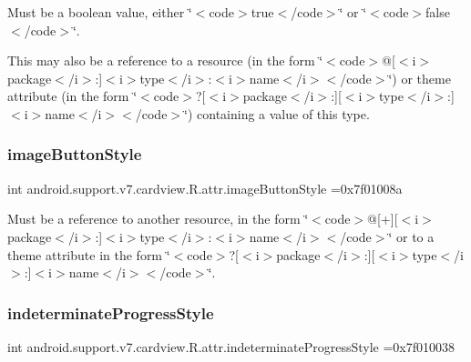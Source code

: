 Must be a boolean value, either \char`\"{}$<$code$>$true$<$/code$>$\char`\"{} or \char`\"{}$<$code$>$false$<$/code$>$\char`\"{}. 

This may also be a reference to a resource (in the form \char`\"{}$<$code$>$@\mbox{[}$<$i$>$package$<$/i$>$\+:\mbox{]}$<$i$>$type$<$/i$>$\+:$<$i$>$name$<$/i$>$$<$/code$>$\char`\"{}) or theme attribute (in the form \char`\"{}$<$code$>$?\mbox{[}$<$i$>$package$<$/i$>$\+:\mbox{]}\mbox{[}$<$i$>$type$<$/i$>$\+:\mbox{]}$<$i$>$name$<$/i$>$$<$/code$>$\char`\"{}) containing a value of this type. \mbox{\label{classandroid_1_1support_1_1v7_1_1cardview_1_1R_1_1attr_a36e9cbb5329e25be31dcb0c96046568d}} 
\subsubsection{\texorpdfstring{image\+Button\+Style}{imageButtonStyle}}
{\footnotesize\ttfamily int android.\+support.\+v7.\+cardview.\+R.\+attr.\+image\+Button\+Style =0x7f01008a\hspace{0.3cm}{\ttfamily [static]}}

Must be a reference to another resource, in the form \char`\"{}$<$code$>$@\mbox{[}+\mbox{]}\mbox{[}$<$i$>$package$<$/i$>$\+:\mbox{]}$<$i$>$type$<$/i$>$\+:$<$i$>$name$<$/i$>$$<$/code$>$\char`\"{} or to a theme attribute in the form \char`\"{}$<$code$>$?\mbox{[}$<$i$>$package$<$/i$>$\+:\mbox{]}\mbox{[}$<$i$>$type$<$/i$>$\+:\mbox{]}$<$i$>$name$<$/i$>$$<$/code$>$\char`\"{}. \mbox{\label{classandroid_1_1support_1_1v7_1_1cardview_1_1R_1_1attr_a001418b7a674dd9d6eb9d1bf296281ea}} 
\subsubsection{\texorpdfstring{indeterminate\+Progress\+Style}{indeterminateProgressStyle}}
{\footnotesize\ttfamily int android.\+support.\+v7.\+cardview.\+R.\+attr.\+indeterminate\+Progress\+Style =0x7f010038\hspace{0.3cm}{\ttfamily [static]}}

